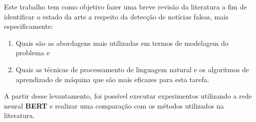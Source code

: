 Este trabalho tem como objetivo fazer uma breve revisão da literatura a fim de identificar o estado da arte a respeito da detecção de notícias falsas, mais especificamente: 
\begin{enumerate}
\item Quais são as abordagens mais utilizadas em termos de modelagem do problema e 
\item Quais as técnicas de processamento de linguagem natural e os algoritmos de aprendizado de máquina que são mais eficazes para esta tarefa.
   
\end{enumerate}
A partir desse levantamento, foi possível executar experimentos utilizando a rede neural \textbf{BERT} e realizar uma comparação com os métodos utilizados na literatura.



